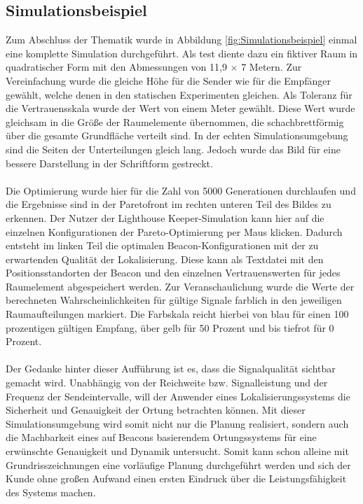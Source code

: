 \subsection{Simulationsbeispiel}
Zum Abschluss der Thematik wurde in Abbildung \ref{fig:Simulationsbeispiel} einmal eine komplette Simulation durchgeführt. Als test diente dazu ein fiktiver Raum in quadratischer Form mit den Abmessungen von 11,9 $\times$ 7 Metern. Zur Vereinfachung wurde die gleiche Höhe für die Sender wie für die Empfänger gewählt, welche denen in den statischen Experimenten gleichen. Als Toleranz für die Vertrauensskala wurde der Wert von einem Meter gewählt. Diese Wert wurde gleichsam in die Größe der Raumelemente übernommen, die schachbrettförmig über die gesamte Grundfläche verteilt sind. In der echten Simulationsumgebung sind die Seiten der Unterteilungen gleich lang. Jedoch wurde das Bild für eine bessere Darstellung in der Schriftform gestreckt. \\ \\
Die Optimierung wurde hier für die Zahl von 5000 Generationen durchlaufen und die Ergebnisse sind in der Paretofront im rechten unteren Teil des Bildes zu erkennen. Der Nutzer der Lighthouse Keeper-Simulation kann hier auf die einzelnen Konfigurationen der Pareto-Optimierung per Maus klicken. Dadurch entsteht im linken Teil die optimalen Beacon-Konfigurationen mit der zu erwartenden Qualität der Lokalisierung. Diese kann als Textdatei mit den Positionsstandorten der Beacon und den einzelnen Vertrauenswerten für jedes Raumelement abgespeichert werden. Zur Veranschaulichung wurde die Werte der berechneten Wahrscheinlichkeiten für gültige Signale farblich in den jeweiligen Raumaufteilungen markiert. Die Farbskala reicht hierbei von blau für einen 100 prozentigen gültigen Empfang, über gelb für 50 Prozent und bis tiefrot für 0 Prozent. \\ \\
Der Gedanke hinter dieser Aufführung ist es, dass die Signalqualität sichtbar gemacht wird. Unabhängig von der Reichweite bzw. Signalleistung und der Frequenz der Sendeintervalle, will der Anwender eines Lokalisierungssystems die Sicherheit und Genauigkeit der Ortung betrachten können. Mit dieser Simulationsumgebung wird somit nicht nur die Planung realisiert, sondern auch die Machbarkeit eines auf Beacons basierendem Ortungssystems für eine erwünschte Genauigkeit und Dynamik untersucht. Somit kann schon alleine mit Grundrisszeichnungen eine vorläufige Planung durchgeführt werden und sich der Kunde ohne großen Aufwand einen ersten Eindruck über die Leistungsfähigkeit des Systems machen. 
